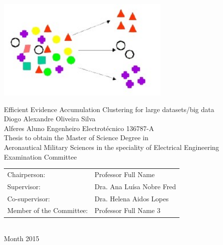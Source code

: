 \begin{center}
%
\vspace{2.5cm}
\includegraphics[height=50mm]{Figures/clustering.jpg}

\vspace{1.0cm}
{\FontLb Efficient Evidence Accumulation Clustering for large datasets/big data} \\
\vspace{2.7cm}
{\FontMb Diogo Alexandre Oliveira Silva} \\
{\FontMb Alferes Aluno Engenheiro Electrotécnico 136787-A} \\
\vspace{2.0cm}
{\FontSn Thesis to obtain the Master of Science Degree in} \\
\vspace{0.3cm}
{\FontLb Aeronautical Military Sciences in the speciality of Electrical Engineering} \\
\vspace{1.1cm}
\vspace{1.1cm}
{\FontMb Examination Committee} \\
\vspace{0.3cm}
{\FontSn %
\begin{tabular}{ll}
Chairperson: & Professor Full Name \\
Supervisor: & Dra. Ana Luísa Nobre Fred \\
Co-supervisor: & Dra. Helena Aidos Lopes \\
Member of the Committee: & Professor Full Name 3
\end{tabular} } \\
\vspace{1.5cm}
{\FontMb Month 2015} \\
%
\end{center}

\cleardoublepage

